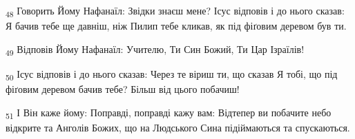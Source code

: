 \begin{tcolorbox}
\textsubscript{48} Говорить Йому Нафанаїл: Звідки знаєш мене? Ісус відповів і до нього сказав: Я бачив тебе ще давніш, ніж Пилип тебе кликав, як під фіґовим деревом був ти.
\end{tcolorbox}
\begin{tcolorbox}
\textsubscript{49} Відповів Йому Нафанаїл: Учителю, Ти Син Божий, Ти Цар Ізраїлів!
\end{tcolorbox}
\begin{tcolorbox}
\textsubscript{50} Ісус відповів і до нього сказав: Через те віриш ти, що сказав Я тобі, що під фіґовим деревом бачив тебе? Більш від цього побачиш!
\end{tcolorbox}
\begin{tcolorbox}
\textsubscript{51} І Він каже йому: Поправді, поправді кажу вам: Відтепер ви побачите небо відкрите та Анголів Божих, що на Людського Сина підіймаються та спускаються.
\end{tcolorbox}
